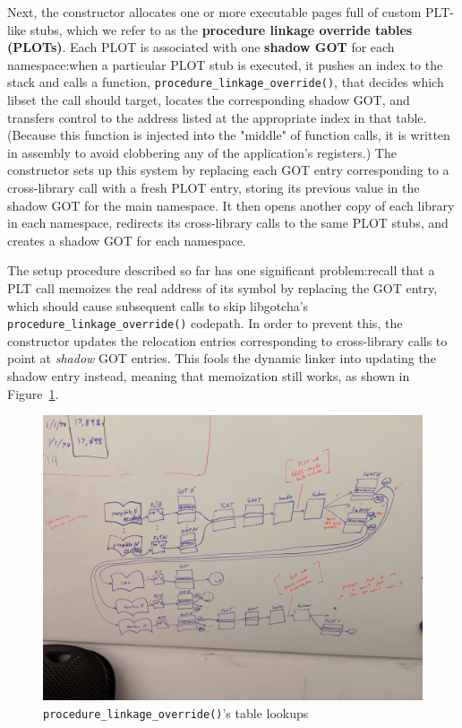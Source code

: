 Next, the constructor allocates one or more executable pages full of custom PLT-like
stubs, which we refer to as the \textbf{procedure linkage override tables (PLOTs)}.
Each PLOT is associated with one \textbf{shadow GOT} for each namespace:\@ when a
particular PLOT stub is executed, it pushes an index to the stack and calls a
function, \texttt{procedure\_linkage\_override()}, that decides which libset the call
should target, locates the corresponding shadow GOT, and transfers control to the
address listed at the appropriate index in that table.  (Because this function
is injected into the "middle" of function calls, it is written in assembly to avoid
clobbering any of the application's registers.)  The constructor sets up this system
by replacing each GOT entry corresponding to a cross-library call with a fresh PLOT
entry, storing its previous value in the shadow GOT for the main namespace.  It
then opens another copy of each library in each namespace, redirects its
cross-library calls to the same PLOT stubs, and creates a shadow GOT for each
namespace.

The setup procedure described so far has one significant problem:\@ recall that a PLT
call memoizes the real address of its symbol by replacing the GOT entry, which should
cause subsequent calls to skip libgotcha's \texttt{procedure\_linkage\_override()}
codepath.  In order to prevent this, the constructor updates the relocation entries
corresponding to cross-library calls to point at \textit{shadow} GOT entries.  This
fools the dynamic linker into updating the shadow entry instead, meaning that
memoization still works, as shown in Figure~\ref{fig:override}.

\begin{figure}
\includegraphics[width=\columnwidth]{figs/tables}
\caption{\texttt{procedure\_linkage\_override()}'s table lookups}
\label{fig:override}
\end{figure}

